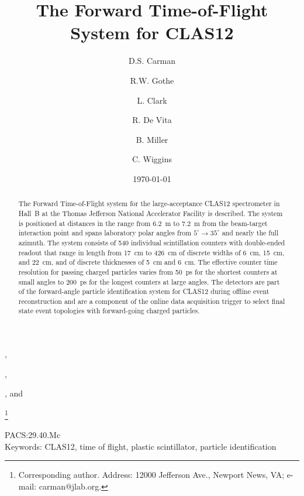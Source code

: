 \documentclass{elsart}
\begin{document}
\begin{frontmatter}

\title{The Forward Time-of-Flight System for CLAS12}

\author[JLab]{D.S. Carman},
\author[USC]{R.W. Gothe},
\author[Glasgow]{L. Clark}
\author[INFN]{R. De Vita}
\author[JLab]{B. Miller}, and
\author[JLab]{C. Wiggins}

\address[JLab]{Thomas Jefferson National Accelerator Facility, Newport News, VA 23606, USA}
\address[USC]{University of South Carolina, Columbia, SC 29208, USA}
\address[Glasgow]{University of Glasgow, Glasgow G12 8QQ, United Kingdom}
\address[INFN]{INFN, Sezione di Genova, 16146 Genova, Italy}
\thanks[corresponding]{Corresponding author. Address: 12000 Jefferson Ave., Newport News, VA; 
e-mail: carman@jlab.org.}

\date{\today}


\begin{abstract}
The Forward Time-of-Flight system for the large-acceptance CLAS12 spectrometer in Hall~B at the
Thomas Jefferson National Accelerator Facility is described. The system is positioned at distances
in the range from 6.2~m to 7.2~m from the beam-target interaction point and spans laboratory polar
angles from $5^\circ \to 35^\circ$ and nearly the full azimuth. The system consists of 540 individual
scintillation counters with double-ended readout that range in length from 17~cm to 426~cm of
discrete widths of 6~cm, 15~cm, and 22~cm, and of discrete thicknesses of 5~cm and 6~cm. The
effective counter time resolution for passing charged particles varies from 50~ps for the shortest
counters at small angles to 200~ps for the longest counters at large angles. The detectors are part
of the forward-angle particle identification system for CLAS12 during offline event reconstruction
and are a component of the online data acquisition trigger to select final state event topologies with
forward-going charged particles.
\end{abstract}

\end{frontmatter}

PACS:29.40.Mc \\
Keywords: CLAS12, time of flight, plastic scintillator, particle identification
\newpage
\end{document}
